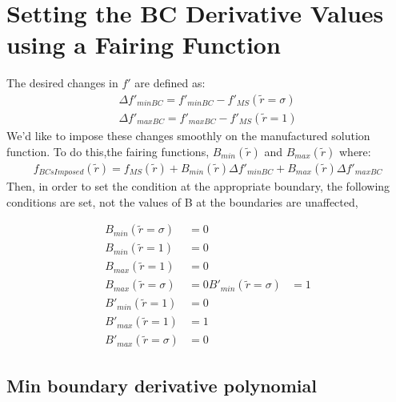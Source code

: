 \documentclass[a4paper]{article}
\begin{document}




\section{Setting the BC Derivative Values using a Fairing Function}


The desired changes in $f'$ are defined as:
\begin{align*}
    \Delta f'_{minBC} = f'_{minBC} - f'_{MS}(\widetilde{r} = \sigma)\\
    \Delta f'_{maxBC} = f'_{maxBC} - f'_{MS}(\widetilde{r} = 1) 
\end{align*}
We'd like to impose these changes smoothly on the manufactured solution function.
To do this,the fairing functions, $B_{min}(\widetilde{r})$ and $B_{max}(\widetilde{r})$
where:
\begin{align*}
    f_{BCsImposed}(\widetilde{r}) = f_{MS}(\widetilde{r}) +
    B_{min}(\widetilde{r}) \Delta f'_{minBC}  +  
    B_{max}(\widetilde{r}) \Delta f'_{maxBC}  
\end{align*}
Then, in order to set the condition at the appropriate boundary, the following 
conditions are set, not the values of B at the boundaries are unaffected,


\begin{align*}
    B_{min}(\widetilde{r} = \sigma) &= 0\\
    B_{min}(\widetilde{r} = 1) &= 0 \\
    B_{max}(\widetilde{r} = 1) &= 0 \\
    B_{max}(\widetilde{r} = \sigma) &= 0 
    B'_{min}(\widetilde{r} = \sigma) &= 1\\
    B'_{min}(\widetilde{r} = 1) &= 0 \\
    B'_{max}(\widetilde{r} = 1) &= 1 \\
    B'_{max}(\widetilde{r} = \sigma) &= 0 
\end{align*}
%
%

\subsection{Min boundary derivative polynomial}
\end{document}
